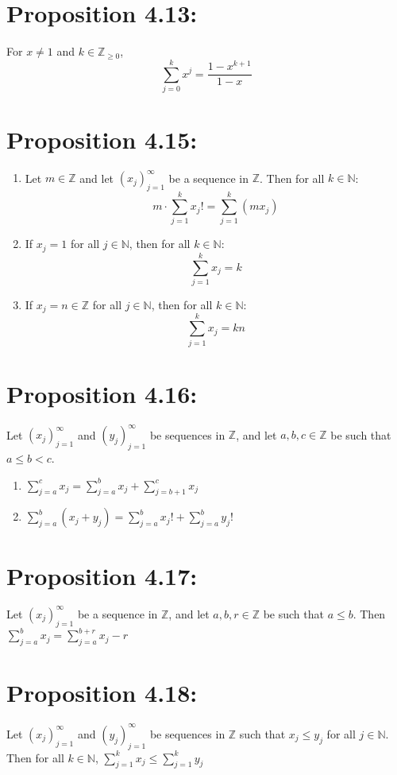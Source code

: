 \section*{Proposition 4.13:}
For $x \neq 1$ and $k \in \mathbb{Z}_{\geq 0}$,
\[ \sum_{j=0}^k x^j = \frac{1 - x^{k+1}}{1 - x} \]

\section*{Proposition 4.15:}
\begin{enumerate}
    \item Let $m \in \mathbb{Z}$ and let $(x_j)_{j=1}^{\infty}$ be a sequence in $\mathbb{Z}$. Then for all $k \in \mathbb{N}$:
    \[ m \cdot \sum_{j=1}^k x_j! = \sum_{j=1}^k (mx_j) \]
    \item If $x_j = 1$ for all $j \in \mathbb{N}$, then for all $k \in \mathbb{N}$:
    \[ \sum_{j=1}^k x_j = k \]
    \item If $x_j = n \in \mathbb{Z}$ for all $j \in \mathbb{N}$, then for all $k \in \mathbb{N}$:
    \[ \sum_{j=1}^k x_j = kn \]
\end{enumerate}


\section*{Proposition 4.16:}
Let $(x_j)_{j=1}^{\infty}$ and $(y_j)_{j=1}^{\infty}$ be sequences in $\mathbb{Z}$, and let $a,b,c \in \mathbb{Z}$ be such that $a \leq b < c$.
\begin{enumerate}
    \item $\displaystyle\sum_{j=a}^{c} x_j = \displaystyle\sum_{j=a}^{b} x_j + \displaystyle\sum_{j=b+1}^{c} x_j$
    \item $\displaystyle\sum_{j=a}^{b} (x_j + y_j) = \displaystyle\sum_{j=a}^{b} x_j! + \displaystyle\sum_{j=a}^{b} y_j!$
\end{enumerate}

\section*{Proposition 4.17:}
Let $(x_j)_{j=1}^{\infty}$ be a sequence in $\mathbb{Z}$, and let $a,b, r \in \mathbb{Z}$ be such that $a \leq b$. Then
$\displaystyle\sum_{j=a}^{b} x_j = \displaystyle\sum_{j=a}^{b+r} x_j - r$

\section*{Proposition 4.18:}
Let $(x_j)_{j=1}^{\infty}$ and $(y_j)_{j=1}^{\infty}$ be sequences in $\mathbb{Z}$ such that $x_j \leq y_j$ for all $j \in \mathbb{N}$. Then for all $k \in \mathbb{N}$,
$\displaystyle\sum_{j=1}^{k} x_j \leq \displaystyle\sum_{j=1}^{k} y_j$

